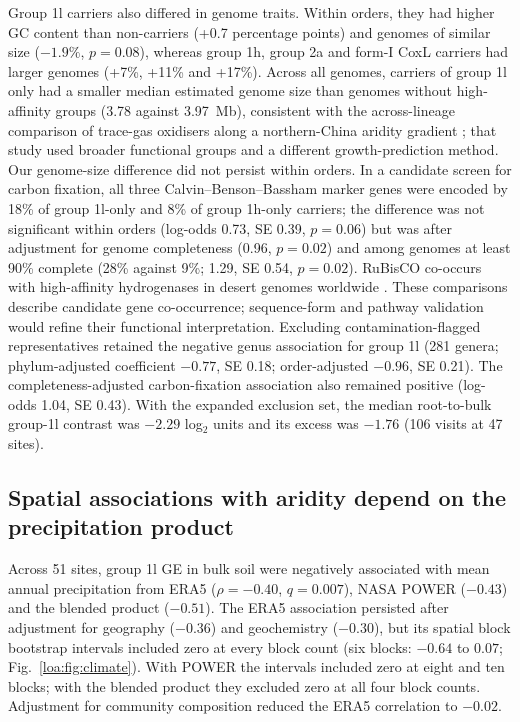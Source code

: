 Group 1l carriers also differed in genome traits. Within orders, they had higher GC content than
non-carriers (+0.7 percentage points) and genomes of similar size ($-1.9\%$, $p=0.08$), whereas group 1h,
group 2a and form-I CoxL carriers had larger genomes (+7\%, +11\% and +17\%). Across all genomes, carriers
of group 1l only had a smaller median estimated genome size than genomes without high-affinity groups
(3.78 against 3.97~Mb), consistent with the across-lineage comparison of trace-gas oxidisers along a
northern-China aridity gradient \citep{wang2025genomesize}; that study used broader functional groups
and a different growth-prediction method. Our genome-size difference did not persist within orders. In a candidate screen for
carbon fixation, all three Calvin--Benson--Bassham marker genes were encoded by 18\% of group 1l-only and
8\% of group 1h-only carriers; the difference was not significant within orders (log-odds 0.73, SE 0.39,
$p=0.06$) but was after adjustment for genome completeness (0.96, $p=0.02$) and among genomes at least 90\%
complete (28\% against 9\%; 1.29, SE 0.54, $p=0.02$). RuBisCO co-occurs with high-affinity hydrogenases in
desert genomes worldwide \citep{leung2025aridity}. These comparisons describe candidate gene co-occurrence;
sequence-form and pathway validation would refine their functional interpretation. Excluding contamination-flagged
representatives retained the negative genus association for group 1l (281 genera; phylum-adjusted coefficient
$-0.77$, SE 0.18; order-adjusted $-0.96$, SE 0.21). The completeness-adjusted carbon-fixation association
also remained positive (log-odds 1.04, SE 0.43). With the expanded exclusion set, the median
root-to-bulk group-1l contrast was $-2.29$ log$_2$ units and its excess was $-1.76$ (106 visits at 47 sites).


\subsection*{Spatial associations with aridity depend on the precipitation product}
Across 51 sites, group 1l GE in bulk soil were negatively associated with mean annual precipitation from
ERA5 ($\rho=-0.40$, $q=0.007$), NASA POWER ($-0.43$) and the blended product ($-0.51$).
The ERA5 association persisted after adjustment for geography ($-0.36$) and geochemistry ($-0.30$),
but its spatial block bootstrap intervals included zero at every block count (six blocks: $-0.64$ to
$0.07$; Fig.~\ref{loa:fig:climate}). With POWER the intervals included zero at eight and ten blocks;
with the blended product they excluded zero at all four block counts. Adjustment for community composition
reduced the ERA5 correlation to $-0.02$.

